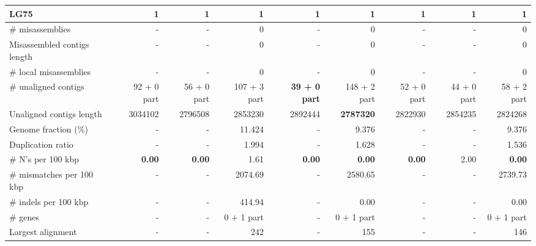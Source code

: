 \documentclass[12pt,a4paper]{article}
\begin{document}
\begin{table}[ht]
\begin{center}
\begin{tabular}{|l*{8}{|r}|}
LG75 & 1 & 1 & 1 & 1 & 1 & 1 & 1 & 1 \\ \hline
\# misassemblies & - & - & 0 & - & 0 & - & - & 0 \\ \hline
Misassembled contigs length & - & - & 0 & - & 0 & - & - & 0 \\ \hline
\# local misassemblies & - & - & 0 & - & 0 & - & - & 0 \\ \hline
\# unaligned contigs & 92 + 0 part & 56 + 0 part & 107 + 3 part & {\bf 39 + 0 part} & 148 + 2 part & 52 + 0 part & 44 + 0 part & 58 + 2 part \\ \hline
Unaligned contigs length & 3034102 & 2796508 & 2853230 & 2892444 & {\bf 2787320} & 2822930 & 2854235 & 2824268 \\ \hline
Genome fraction (\%) & - & - & 11.424 & - & 9.376 & - & - & 9.376 \\ \hline
Duplication ratio & - & - & 1.994 & - & 1.628 & - & - & 1.536 \\ \hline
\# N's per 100 kbp & {\bf 0.00} & {\bf 0.00} & 1.61 & {\bf 0.00} & {\bf 0.00} & {\bf 0.00} & 2.00 & {\bf 0.00} \\ \hline
\# mismatches per 100 kbp & - & - & 2074.69 & - & 2580.65 & - & - & 2739.73 \\ \hline
\# indels per 100 kbp & - & - & 414.94 & - & 0.00 & - & - & 0.00 \\ \hline
\# genes & - & - & 0 + 1 part & - & 0 + 1 part & - & - & 0 + 1 part \\ \hline
Largest alignment & - & - & 242 & - & 155 & - & - & 146 \\ \hline
\end{tabular}
\end{center}
\end{table}
\end{document}
